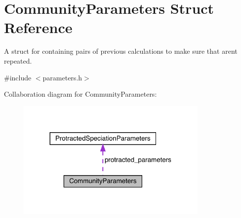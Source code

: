 \hypertarget{struct_community_parameters}{}\section{Community\+Parameters Struct Reference}
\label{struct_community_parameters}


A struct for containing pairs of previous calculations to make sure that aren\textquotesingle{}t repeated.  




{\ttfamily \#include $<$parameters.\+h$>$}



Collaboration diagram for Community\+Parameters\+:
\nopagebreak
\begin{figure}[H]
\begin{center}
\leavevmode
\includegraphics[width=264pt]{struct_community_parameters__coll__graph}
\end{center}
\end{figure}
